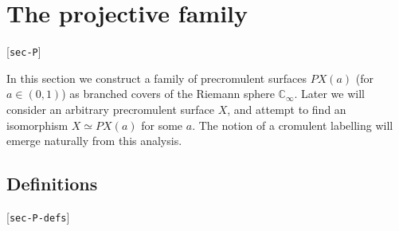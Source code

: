 \documentclass[reqno]{amsart}
\newcommand{\lbl}[1]{\label{#1}\textup{[\texttt{#1}]}\par}
\newcommand{\lbl}{\label}
\newcommand{\C}         {{\mathbb{C}}}
\renewcommand{\:}{\colon}
\theoremstyle{definition}
\begin{document}
\section{The projective family}
\lbl{sec-P}

In this section we construct a family of precromulent surfaces $PX(a)$
(for $a\in (0,1)$) as branched covers of the Riemann sphere
$\C_\infty$.  Later we will consider an arbitrary precromulent surface
$X$, and attempt to find an isomorphism $X\simeq PX(a)$ for some $a$.
The notion of a cromulent labelling will emerge naturally from this
analysis.

\subsection{Definitions}
\lbl{sec-P-defs}
\end{document}
